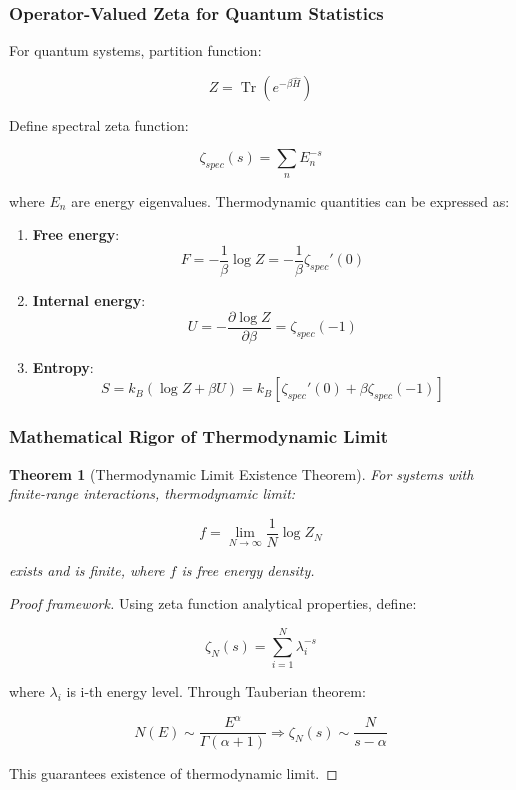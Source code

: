 \documentclass[12pt,a4paper]{article}
\newtheorem{theorem}{Theorem}[section]
\DeclareMathOperator{\Tr}{Tr}
\begin{document}
\subsubsection{Operator-Valued Zeta for Quantum Statistics}

For quantum systems, partition function:

$$Z = \Tr(e^{-\beta\hat{H}})$$

Define spectral zeta function:

$$\zeta_{spec}(s) = \sum_{n} E_n^{-s}$$

where $E_n$ are energy eigenvalues. Thermodynamic quantities can be expressed as:

\begin{enumerate}
\item \textbf{Free energy}:
   $$F = -\frac{1}{\beta} \log Z = -\frac{1}{\beta} \zeta_{spec}'(0)$$

\item \textbf{Internal energy}:
   $$U = -\frac{\partial \log Z}{\partial \beta} = \zeta_{spec}(-1)$$

\item \textbf{Entropy}:
   $$S = k_B(\log Z + \beta U) = k_B[\zeta_{spec}'(0) + \beta\zeta_{spec}(-1)]$$
\end{enumerate}

\subsubsection{Mathematical Rigor of Thermodynamic Limit}

\begin{theorem}[Thermodynamic Limit Existence Theorem]
For systems with finite-range interactions, thermodynamic limit:

$$f = \lim_{N \to \infty} \frac{1}{N} \log Z_N$$

exists and is finite, where $f$ is free energy density.
\end{theorem}

\begin{proof}[Proof framework]
Using zeta function analytical properties, define:

$$\zeta_N(s) = \sum_{i=1}^{N} \lambda_i^{-s}$$

where $\lambda_i$ is i-th energy level. Through Tauberian theorem:

$$N(E) \sim \frac{E^{\alpha}}{\Gamma(\alpha+1)} \Rightarrow \zeta_N(s) \sim \frac{N}{s-\alpha}$$

This guarantees existence of thermodynamic limit.
\end{proof}
\end{document}

